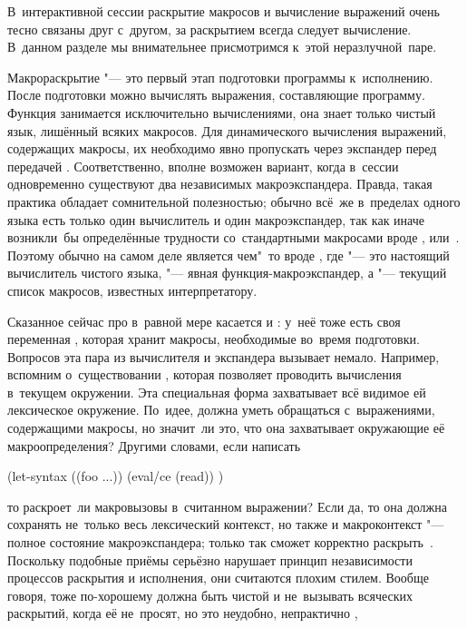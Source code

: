 В~интерактивной сессии раскрытие макросов и вычисление выражений очень тесно
связаны друг с~другом, за раскрытием всегда следует вычисление. В~данном разделе
мы внимательнее присмотримся к~этой неразлучной~паре.

Макрораскрытие "--- это первый этап подготовки программы к~исполнению. После
подготовки можно вычислять выражения, составляющие программу. Функция 
занимается исключительно вычислениями, она знает только чистый язык, лишённый
всяких макросов. Для динамического вычисления выражений, содержащих макросы, их
необходимо явно пропускать через экспандер перед передачей .
Соответственно, вполне возможен вариант, когда в~сессии одновременно существуют
два независимых макроэкспандера. Правда, такая практика обладает сомнительной
полезностью; обычно всё~же в~пределах одного языка есть только один вычислитель
и один макроэкспандер, так как иначе возникли~бы определённые трудности
со~стандартными макросами вроде ,  или~. Поэтому
обычно  на самом деле является чем"~то вроде , где  "--- это настоящий вычислитель
чистого языка,  "--- явная функция-макро\-экспандер, а
 "--- текущий список макросов, известных интерпретатору.

Сказанное сейчас про  в~равной мере касается и : у~неё
тоже есть своя переменная , которая хранит макросы, необходимые
во~время подготовки. Вопросов эта пара из вычислителя и экспандера вызывает
немало. Например, вспомним 
о~существовании , которая позволяет проводить вычисления в~текущем
окружении. Эта специальная форма захватывает всё видимое ей лексическое
окружение. По~идее,  должна уметь обращаться с~выражениями,
содержащими макросы, но значит~ли это, что она захватывает окружающие её
макроопределения? Другими словами, если написать

\begin{code:lisp}
(let-syntax ((foo ...))
  (eval/ce (read)) )
\end{code:lisp}

\noindent
то раскроет~ли  макровызовы  в~считанном выражении? Если да,
то она должна сохранять не~только весь лексический контекст, но также и
макроконтекст "--- полное состояние макроэкспандера; только так 
сможет корректно раскрыть~. Поскольку подобные приёмы серьёзно нарушает
принцип независимости процессов раскрытия и исполнения, они считаются плохим
стилем. Вообще говоря,  тоже по-хорошему должна быть чистой и
не~вызывать всяческих раскрытий, когда её не~просят, но это неудобно,
непрактично {\itd}, {\itp}

